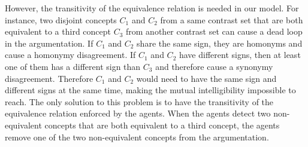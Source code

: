 However, the transitivity of the equivalence relation is needed in our model. For instance, two disjoint concepts $C_{1}$ and $C_{2}$ from a same contrast set that are both equivalent to a third concept $C_{3}$ from another contrast set can cause a dead loop in the argumentation. If $C_{1}$ and $C_{2}$ share the same sign, they are homonyms and cause a homonymy disagreement. If $C_{1}$ and $C_{2}$ have different signs, then at least one of them has a different sign than $C_{3}$ and therefore cause a synonymy disagreement. Therefore $C_{1}$ and $C_{2}$ would need to have the same sign and different signs at the same time, making the mutual intelligibility impossible to reach. The only solution to this problem is to have the transitivity of the equivalence relation enforced by the agents. When the agents detect two non-equivalent concepts that are both equivalent to a third concept, the agents remove one of the two non-equivalent concepts from the argumentation.